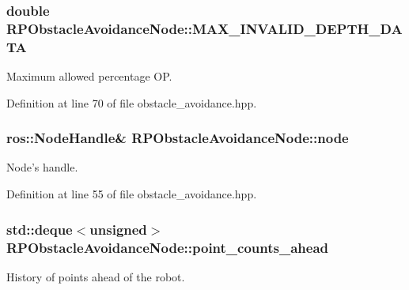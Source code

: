 \hypertarget{class_r_p_obstacle_avoidance_node_a577ee6e3b2d694e01e9e7d9e7ec2766d}{
\subsubsection[{\-M\-A\-X\-\_\-\-I\-N\-V\-A\-L\-I\-D\-\_\-\-D\-E\-P\-T\-H\-\_\-\-D\-A\-T\-A}]{\setlength{\rightskip}{0pt plus 5cm}double {\bf \-R\-P\-Obstacle\-Avoidance\-Node\-::\-M\-A\-X\-\_\-\-I\-N\-V\-A\-L\-I\-D\-\_\-\-D\-E\-P\-T\-H\-\_\-\-D\-A\-T\-A}}}\label{class_r_p_obstacle_avoidance_node_a577ee6e3b2d694e01e9e7d9e7ec2766d}
\-Maximum allowed percentage \-O\-P. 

\-Definition at line 70 of file obstacle\-\_\-avoidance.\-hpp.

\hypertarget{class_r_p_obstacle_avoidance_node_acb163610c79438c473c4f8f8f7531ae2}{
\subsubsection[{node}]{\setlength{\rightskip}{0pt plus 5cm}ros\-::\-Node\-Handle\& {\bf \-R\-P\-Obstacle\-Avoidance\-Node\-::node}}}\label{class_r_p_obstacle_avoidance_node_acb163610c79438c473c4f8f8f7531ae2}
\-Node's handle. 

\-Definition at line 55 of file obstacle\-\_\-avoidance.\-hpp.

\hypertarget{class_r_p_obstacle_avoidance_node_ad7c74afdb4f668cef629901defba0852}{
\subsubsection[{point\-\_\-counts\-\_\-ahead}]{\setlength{\rightskip}{0pt plus 5cm}std\-::deque$<$unsigned$>$ {\bf \-R\-P\-Obstacle\-Avoidance\-Node\-::point\-\_\-counts\-\_\-ahead}}}\label{class_r_p_obstacle_avoidance_node_ad7c74afdb4f668cef629901defba0852}
\-History of points ahead of the robot. 

